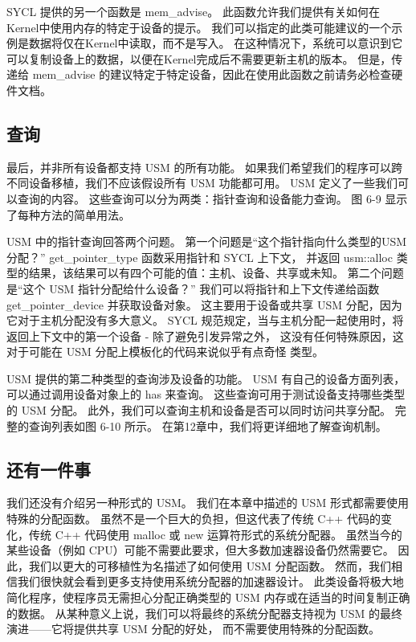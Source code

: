 SYCL 提供的另一个函数是 mem\_advise。 此函数允许我们提供有关如何在Kernel中使用内存的特定于设备的提示。 
我们可以指定的此类可能建议的一个示例是数据将仅在Kernel中读取，而不是写入。 
在这种情况下，系统可以意识到它可以复制设备上的数据，以便在Kernel完成后不需要更新主机的版本。 
但是，传递给 mem\_advise 的建议特定于特定设备，因此在使用此函数之前请务必检查硬件文档。

\subsection{查询}
最后，并非所有设备都支持 USM 的所有功能。 
如果我们希望我们的程序可以跨不同设备移植，我们不应该假设所有 USM 功能都可用。 
USM 定义了一些我们可以查询的内容。 这些查询可以分为两类：指针查询和设备能力查询。 
图 6-9 显示了每种方法的简单用法。

USM 中的指针查询回答两个问题。 
第一个问题是“这个指针指向什么类型的USM分配？” get\_pointer\_type 函数采用指针和 SYCL 上下文，
并返回 usm::alloc 类型的结果，该结果可以有四个可能的值：主机、设备、共享或未知。 
第二个问题是“这个 USM 指针分配给什么设备？” 我们可以将指针和上下文传递给函数 get\_pointer\_device 并获取设备对象。 
这主要用于设备或共享 USM 分配，因为它对于主机分配没有多大意义。 
SYCL 规范规定，当与主机分配一起使用时，将返回上下文中的第一个设备 - 除了避免引发异常之外，
这没有任何特殊原因，这对于可能在 USM 分配上模板化的代码来说似乎有点奇怪 类型。

USM 提供的第二种类型的查询涉及设备的功能。 USM 有自己的设备方面列表，可以通过调用设备对象上的 has 来查询。 
这些查询可用于测试设备支持哪些类型的 USM 分配。 此外，我们可以查询主机和设备是否可以同时访问共享分配。 
完整的查询列表如图 6-10 所示。 在第12章中，我们将更详细地了解查询机制。

\subsection{还有一件事}
我们还没有介绍另一种形式的 USM。 我们在本章中描述的 USM 形式都需要使用特殊的分配函数。 
虽然不是一个巨大的负担，但这代表了传统 C++ 代码的变化，传统 C++ 代码使用 malloc 或 new 运算符形式的系统分配器。 
虽然当今的某些设备（例如 CPU）可能不需要此要求，但大多数加速器设备仍然需要它。 
因此，我们以更大的可移植性为名描述了如何使用 USM 分配函数。 
然而，我们相信我们很快就会看到更多支持使用系统分配器的加速器设计。 
此类设备将极大地简化程序，使程序员无需担心分配正确类型的 USM 内存或在适当的时间复制正确的数据。 
从某种意义上说，我们可以将最终的系统分配器支持视为 USM 的最终演进——它将提供共享 USM 分配的好处，
而不需要使用特殊的分配函数。

